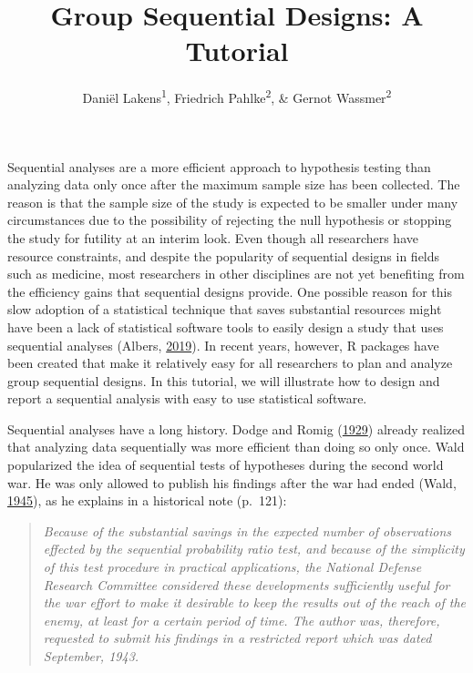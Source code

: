 \documentclass[
  english,
  ,man,floatsintext]{apa6}
\title{Group Sequential Designs: A Tutorial}
\author{Daniël Lakens\textsuperscript{1}, Friedrich Pahlke\textsuperscript{2}, \& Gernot Wassmer\textsuperscript{2}}
\date{}
\affiliation{\vspace{0.5cm}\textsuperscript{1} Eindhoven University of Technology\\\textsuperscript{2} RPACT GbR}
\begin{document}
\maketitle

Sequential analyses are a more efficient approach to hypothesis testing than analyzing data only once after the maximum sample size has been collected. The reason is that the sample size of the study is expected to be smaller under many circumstances due to the possibility of rejecting the null hypothesis or stopping the study for futility at an interim look. Even though all researchers have resource constraints, and despite the popularity of sequential designs in fields such as medicine, most researchers in other disciplines are not yet benefiting from the efficiency gains that sequential designs provide. One possible reason for this slow adoption of a statistical technique that saves substantial resources might have been a lack of statistical software tools to easily design a study that uses sequential analyses (Albers, \protect\hyperlink{ref-albers_problem_2019}{2019}). In recent years, however, R packages have been created that make it relatively easy for all researchers to plan and analyze group sequential designs. In this tutorial, we will illustrate how to design and report a sequential analysis with easy to use statistical software.

Sequential analyses have a long history. Dodge and Romig (\protect\hyperlink{ref-dodge_method_1929}{1929}) already realized that analyzing data sequentially was more efficient than doing so only once. Wald popularized the idea of sequential tests of hypotheses during the second world war. He was only allowed to publish his findings after the war had ended (Wald, \protect\hyperlink{ref-wald_sequential_1945}{1945}), as he explains in a historical note (p.~121):

\begin{quote}
\emph{Because of the substantial savings in the expected number of observations effected by the sequential probability ratio test, and because of the simplicity of this test procedure in practical applications, the National Defense Research Committee considered these developments sufficiently useful for the war effort to make it desirable to keep the results out of the reach of the enemy, at least for a certain period of time. The author was, therefore, requested to submit his findings in a restricted report which was dated September, 1943.}
\end{quote}
\end{document}
